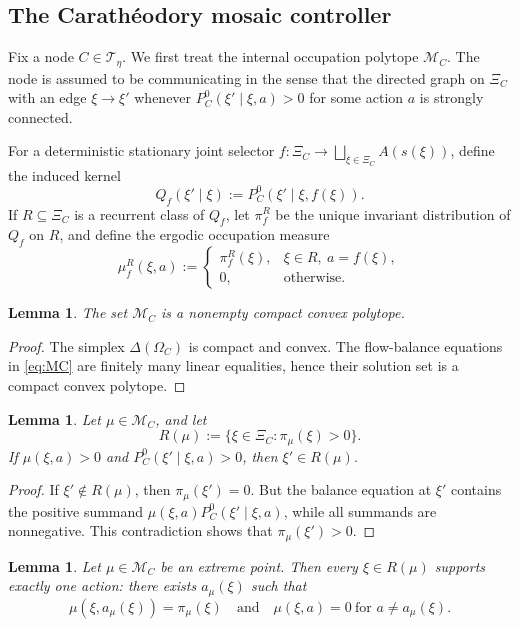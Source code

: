 \documentclass[12pt]{article}
\newtheorem{lemma}[theorem]{Lemma}
\theoremstyle{definition}
\newcommand{\1}{\mathbf{1}}
\newcommand{\cM}{\mathcal{M}}
\newcommand{\cT}{\mathcal{T}}
\begin{document}
\subsection{The Carath\'eodory mosaic controller}
\label{subsec:mosaic}

Fix a node \(C\in \cT_\eta\).  We first treat the internal occupation polytope
\(\cM_C\).  The node is assumed to be communicating in the sense that the directed graph
on \(\Xi_C\) with an edge \(\xi\to \xi'\) whenever
\(P_C^0(\xi'\mid \xi,a)>0\) for some action \(a\) is strongly connected.

For a deterministic stationary joint selector
\(f:\Xi_C\to \bigsqcup_{\xi\in \Xi_C} A(s(\xi))\), define the induced kernel
\[
Q_f(\xi'\mid \xi):=P_C^0(\xi'\mid \xi,f(\xi)).
\]
If \(R\subseteq \Xi_C\) is a recurrent class of \(Q_f\), let \(\pi_f^R\) be the unique
invariant distribution of \(Q_f\) on \(R\), and define the ergodic occupation measure
\[
\mu_f^R(\xi,a):=
\begin{cases}
\pi_f^R(\xi), & \xi\in R,\ a=f(\xi),\\
0, & \text{otherwise}.
\end{cases}
\]

\begin{lemma}
\label{lem:MC-polytope}
The set \(\cM_C\) is a nonempty compact convex polytope.
\end{lemma}

\begin{proof}
The simplex \(\Delta(\Omega_C)\) is compact and convex.  The flow-balance equations in
\eqref{eq:MC} are finitely many linear equalities, hence their solution set is a compact
convex polytope.
\end{proof}

\begin{lemma}
\label{lem:support-closed2}
Let \(\mu\in \cM_C\), and let
\[
R(\mu):=\{\xi\in \Xi_C:\pi_\mu(\xi)>0\}.
\]
If \(\mu(\xi,a)>0\) and \(P_C^0(\xi'\mid \xi,a)>0\), then \(\xi'\in R(\mu)\).
\end{lemma}

\begin{proof}
If \(\xi'\notin R(\mu)\), then \(\pi_\mu(\xi')=0\).  But the balance equation at \(\xi'\)
contains the positive summand \(\mu(\xi,a)P_C^0(\xi'\mid \xi,a)\), while all summands are
nonnegative.  This contradiction shows that \(\pi_\mu(\xi')>0\).
\end{proof}

\begin{lemma}
\label{lem:extreme-deterministic2}
Let \(\mu\in \cM_C\) be an extreme point.  Then every \(\xi\in R(\mu)\) supports exactly
one action: there exists \(a_\mu(\xi)\) such that
\[
\mu(\xi,a_\mu(\xi))=\pi_\mu(\xi)
\quad\text{and}\quad
\mu(\xi,a)=0\ \text{for }a\neq a_\mu(\xi).
\]
\end{lemma}
\end{document}
